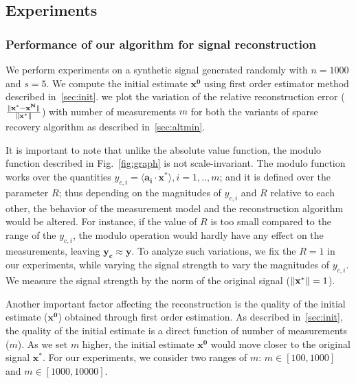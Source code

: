 \subsection{Experiments}

\subsubsection{Performance of our algorithm for signal reconstruction}
We perform experiments on a synthetic signal generated randomly with $n=1000$ and $s=5$. We compute the initial estimate $\mathbf{x^0}$ using first order estimator method described in~\ref{sec:init}. we plot the variation of the relative reconstruction error ($\frac{\|\mathbf{x^*-x^N}\|}{\|\mathbf{x^*}\|}$) with number of measurements $m$ for both the variants of sparse recovery algorithm as described in~\ref{sec:altmin}.

It is important to note that unlike the absolute value function, the modulo function described in Fig.~\ref{fig:graph} is not scale-invariant. The modulo function works over the quantities $y_{c,i}=\langle \mathbf{a_i} \cdot \mathbf{x^*} \rangle, i=1,..,m$; and it is defined over the parameter $R$; thus depending on the magnitudes of $y_{c,i}$ and $R$ relative to each other, the behavior of the measurement model and the reconstruction algorithm would be altered. For instance, if the value of $R$ is too small compared to the range of the $y_{c,i}$, the modulo operation would hardly have any effect on the measurements, leaving $\mathbf{y_c \approx y}$. To analyze such variations, we fix the $R =1$ in our experiments, while varying the signal strength to vary the magnitudes of $y_{c,i}$. We measure the signal strength by the norm of the original signal ($\|\mathbf{{x}^*}\|=1$).

Another important factor affecting the reconstruction is the quality of the initial estimate ($\mathbf{{x}^0}$) obtained through first order estimation. As described in~\ref{sec:init}, the quality of the initial estimate is a direct function of number of measurements ($m$). As we set $m$ higher, the initial estimate $\mathbf{{x}^0}$ would move closer to the original signal $\mathbf{{x}^*}$. For our experiments, we consider two ranges of $m$: $m \in [100,1000]$ and $m \in [1000,10000]$.


